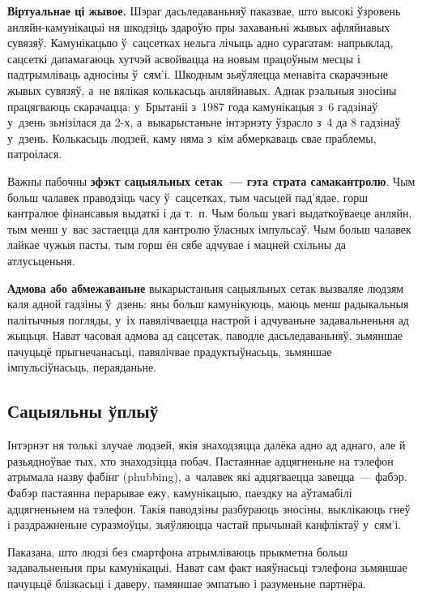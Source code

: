 \textbf{Віртуальнае ці жывое.} Шэраг дасьледаваньняў паказвае, што высокі ўзровень анляйн-камунікацыі ня шкодзіць здароўю пры захаваньні жывых афляйнавых сувязяў. Камунікацыю ў~сацсетках нельга лічыць адно сурагатам: напрыклад, сацсеткі дапамагаюць хутчэй асвойвацца на новым працоўным месцы і падтрымліваць адносіны ў~сям'і. Шкодным зьяўляецца менавіта скарачэньне жывых сувязяў, а~не вялікая колькасьць анляйнавых. Аднак рэальныя зносіны працягваюць скарачацца: у~Брытаніі з~1987 года камунікацыя з~6 гадзінаў у~дзень зьнізілася да 2-х, а~выкарыстаньне інтэрнэту ўзрасло з~4 да 8 гадзінаў у~дзень. Колькасьць людзей, каму няма з~кім абмеркаваць свае праблемы, патроілася.

Важны пабочны \textbf{эфэкт сацыяльных сетак~--- гэта страта самакантролю}. Чым больш чалавек праводзіць часу ў~сацсетках, тым часьцей пад'ядае, горш кантралюе фінансавыя выдаткі і да т.~п. Чым больш увагі выдаткоўваеце анляйн, тым менш у~вас застаецца для кантролю ўласных імпульсаў. Чым больш чалавек лайкае чужыя пасты, тым горш ён сябе адчувае і мацней схільны да атлусьценьня.

\textbf{Адмова або абмежаваньне} выкарыстаньня сацыяльных сетак вызваляе людзям каля адной гадзіны ў~дзень: яны больш камунікуюць, маюць менш радыкальныя палітычныя погляды, у~іх павялічваецца настрой і адчуваньне задавальненьня ад жыцьця. Нават часовая адмова ад сацсетак, паводле дасьледаваньняў, зьмяншае пачуцьцё прыгнечанасьці, павялічвае прадуктыўнасьць, зьмяншае імпульсіўнасьць, пераяданьне.

\subsection*{Сацыяльны ўплыў}

Інтэрнэт ня толькі злучае людзей, якія знаходзяцца далёка адно ад аднаго, але й разьядноўвае тых, хто знаходзіцца побач. Пастаяннае адцягненьне на тэлефон атрымала назву фабінг (phubbing), а~чалавек які адцягваецца завецца~--- фабэр. Фабэр пастаянна перарывае ежу, камунікацыю, паездку на аўтамабілі адцягненьнем на тэлефон. Такія паводзіны разбураюць зносіны, выклікаюць гнеў і раздражненьне суразмоўцы, зьяўляюцца частай прычынай канфліктаў у~сям'і.

Паказана, што людзі без смартфона атрымліваюць прыкметна больш задавальненьня пры камунікацыі. Нават сам факт наяўнасьці тэлефона зьмяншае пачуцьцё блізкасьці і даверу, памяншае эмпатыю і разуменьне партнёра.


